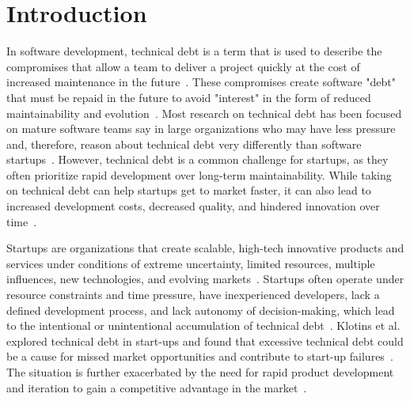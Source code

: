 
\section{Introduction}
In software development, technical debt is a term that is used to describe the compromises that allow a team to deliver a project quickly at the cost of increased maintenance in the future~\cite{Maldonado7332619}.
These compromises create software "debt" that must be repaid in the future to  avoid "interest" in the form of reduced maintainability and evolution~\cite{Seaman6225999}.
Most research on technical debt has been focused on mature software teams say in large organizations who may have less pressure and, therefore, reason about technical debt very differently than software startups~\cite{Besker2018,Li:2015}.
However, technical debt is a common challenge for startups, as they often prioritize rapid development over long-term maintainability.
While taking on technical debt can help startups get to market faster, it can also lead to increased development costs, decreased quality, and hindered innovation over time~\cite{Seaman6225999, DesignSt86:online}.

Startups are organizations that create scalable, high-tech innovative products and services under conditions of extreme uncertainty, limited resources, multiple influences, new technologies, and evolving markets~\cite{Unterkalmsteiner16,Sutton854066}.
Startups often operate under resource constraints and time pressure, have inexperienced developers, lack a defined development process, and lack autonomy of decision-making, which lead to the intentional or unintentional accumulation of technical debt~\cite{Besker2018}.
Klotins et al. explored technical debt in start-ups and found that excessive technical debt could be a cause for missed market opportunities and contribute to start-up failures~\cite{Klotins:2018:ETD}.
The situation is further exacerbated by the need for rapid product development and iteration to gain a competitive advantage in the market~\cite{Cico0JNM20}.

